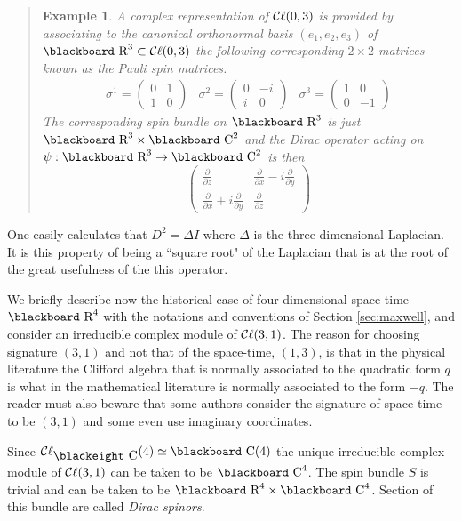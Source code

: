 \documentclass[12pt,titlepage]{article}
\def\bbf#1{\hbox{\blackboard #1}}
\def\bbfeight#1{\hbox{\blackeight #1}}
\def\lC{\bbf C}
\def\lCe{\bbfeight C}
\def\lR{\bbf R}
\def\cC{{\cal C}}
\def\Cl{{\cC\ell}}
\newtheorem{eg}{Example}
\newenvironment{example}{\begin{quote}\begin{eg}}{\end{eg}\end{quote}}
\begin{document}
\begin{example}%
A complex representation of \(\Cl(0,3)\) is provided by associating to the
canonical  
orthonormal basis \((e_1, e_2, e_3)\) of \(\lR^3\subset \Cl(0,3)\) 
the following corresponding \(2\times 2\) matrices 
known as the 
{\em Pauli spin matrices}.
%
\[
\begin{array}{ccc}%
\sigma^1 = \left(\begin{array}{cc}0 & 1 \\ 1 & 0\end{array}\right) &
\sigma^2=\left(\begin{array}{cc}0 & -i \\ i & 0\end{array}\right) &
\sigma^3=\left(\begin{array}{cc}1 & 0 \\ 0 & -1\end{array}\right)
\end{array}
\]
The corresponding spin bundle on \(\lR^3\) is just  \(\lR^3\times
\lC^2\) and the Dirac operator acting on \(\psi:\lR^3\to \lC^2\) is then
\[
\left(\begin{array}{cc}%
\frac{\partial}{\partial z} & \frac{\partial}{\partial x}-
i\frac{\partial}{\partial y} \\
\frac{\partial}{\partial x} + i\frac{\partial}{\partial y} &
\frac{\partial}{\partial z}
\end{array}\right)
\]
\end{example}%

One easily calculates that \(D^2 = \Delta I\) where \(\Delta\) is the
three-dimensional Laplacian. It is this property of being a ``square
root" of the Laplacian that is at the root of the great usefulness of
the this operator. 


We briefly describe now  the historical case of four-dimensional
space-time \(\lR^4\) with the notations and conventions of Section
\ref{sec:maxwell}, and consider an irreducible complex module of 
\(\Cl(3,1)\). The reason for choosing signature \((3,1)\) and not 
that of the space-time,  \((1,3)\), is that in the 
physical literature the Clifford
algebra that is normally associated to the quadratic form \(q\) is what
in the mathematical literature is normally associated to the form 
\(-q\). The reader must also beware that some authors consider the 
signature
of space-time to be \((3,1)\) and some even use imaginary
coordinates. 

Since \(\Cl_{\lCe}(4) \simeq \lC(4)\) the unique 
irreducible complex module of
\(\Cl(3,1)\) can be taken to be \(\lC^4\). The spin bundle \(S\)
 is trivial
and can be taken to be \(\lR^4\times \lC^4\). Section of this bundle are
called {\em Dirac spinors\/}. 
%
\end{document}
